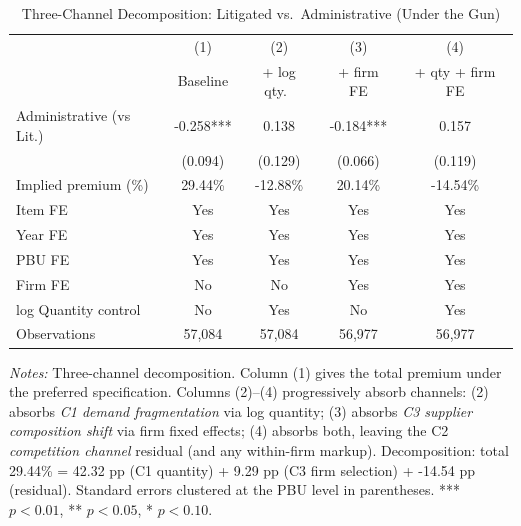\begin{table}[ht]
  \centering
  \caption{Three-Channel Decomposition: Litigated vs.\ Administrative (Under the Gun)}
  \label{tab:three_channel_utg}
  \small
  \begin{threeparttable}
  \begin{tabular}{lcccc}
    \hline\hline
                                    & (1)         & (2)            & (3)        & (4)             \\
                                    & Baseline    & + log qty.\   & + firm FE  & + qty + firm FE \\
    \hline
    Administrative (vs Lit.) & -0.258*** & 0.138 & -0.184*** & 0.157 \\
                                    & (0.094) & (0.129) & (0.066) & (0.119) \\[3pt]
    Implied premium (\%)            & 29.44\% & -12.88\% & 20.14\% & -14.54\% \\
    \hline
    Item FE                          & Yes & Yes & Yes & Yes \\
    Year FE                          & Yes & Yes & Yes & Yes \\
    PBU FE                           & Yes & Yes & Yes & Yes \\
    Firm FE                          & No  & No  & Yes & Yes \\
    log Quantity control             & No  & Yes & No  & Yes \\
    \hline
    Observations                     & 57,084 & 57,084 & 56,977 & 56,977 \\
    \hline\hline
  \end{tabular}
  \begin{tablenotes}
    \small
    \item \textit{Notes:} Three-channel decomposition. Column (1) gives
    the total premium under the preferred specification. Columns (2)--(4)
    progressively absorb channels: (2) absorbs \emph{C1 demand fragmentation}
    via log quantity; (3) absorbs \emph{C3 supplier composition shift}
    via firm fixed effects; (4) absorbs both, leaving the C2
    \emph{competition channel} residual (and any within-firm markup).
    Decomposition: total 29.44\% = 42.32 pp (C1 quantity) + 9.29 pp (C3 firm
    selection) + -14.54 pp (residual).
    Standard errors clustered at the PBU level in parentheses.
    *** $p<0.01$, ** $p<0.05$, * $p<0.10$.
  \end{tablenotes}
  \end{threeparttable}
\end{table}

